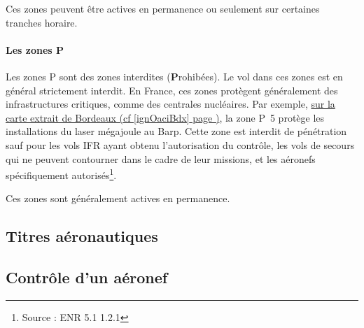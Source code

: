 			Ces zones peuvent être actives en permanence ou seulement sur certaines tranches horaire.
			
			\paragraph{Les zones P}
			Les zones P sont des zones interdites (\textbf{P}rohibées). Le vol dans ces zones est en général strictement interdit. En France, ces zones protègent généralement des infrastructures critiques, comme des centrales nucléaires. Par exemple, \hyperlink{ignOaciBordeaux.1}{sur la carte extrait de Bordeaux (cf \ref{ignOaciBdx} page \pageref{ignOaciBdx})}, la zone P~5 protège les installations du laser mégajoule au Barp. Cette zone est interdit de pénétration sauf pour les vols IFR ayant obtenu l'autorisation du contrôle, les vols de secours qui ne peuvent contourner dans le cadre de leur missions, et les aéronefs spécifiquement autorisés\footnote{Source : ENR 5.1 1.2.1}.
			
			Ces zones sont généralement actives en permanence.
	
	\subsection{Titres aéronautiques}
	
	\subsection{Contrôle d'un aéronef}
